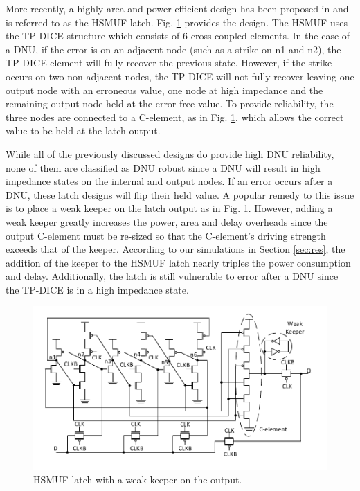 More recently, a highly area and power efficient design has been proposed in \cite{HSMUF} and is referred to as the HSMUF latch. Fig. \ref{HSMUF_fig} provides the design. The HSMUF uses the TP-DICE \cite{TPDICE} structure which consists of 6 cross-coupled elements. In the case of a DNU, if the error is on an adjacent node (such as a strike on n1 and n2), the TP-DICE element will fully recover the previous state. However, if the strike occurs on two non-adjacent nodes, the TP-DICE will not fully recover leaving one output node with an erroneous value, one node at high impedance and the remaining output node held at the error-free value. To provide reliability, the three nodes are connected to a C-element, as in Fig. \ref{HSMUF_fig}, which allows the correct value to be held at the latch output. 

While all of the previously discussed designs do provide high DNU reliability, none of them are classified as DNU robust since a DNU will result in high impedance states on the internal and output nodes. If an error occurs after a DNU, these latch designs will flip their held value. A popular remedy to this issue is to place a weak keeper on the latch output as in Fig. \ref{HSMUF_fig}. However, adding a weak keeper greatly increases the power, area and delay overheads since the output C-element must be re-sized so that the C-element's driving strength exceeds that of the keeper. According to our simulations in Section \ref{sec:res}, the addition of the keeper to the HSMUF latch nearly triples the power consumption and delay. Additionally, the latch is still vulnerable to error after a DNU since the TP-DICE is in a high impedance state.

\begin{figure}[!htbp]
	\centering
	\includegraphics[width=\linewidth]{Figures/HSMUF}
	\caption{HSMUF latch \cite{HSMUF} with a weak keeper on the output.}
	\label{HSMUF_fig}
\end{figure}

